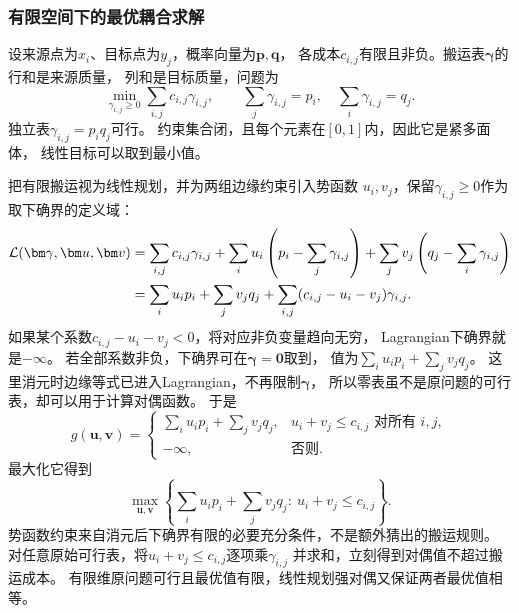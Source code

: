 \subsubsection{有限空间下的最优耦合求解}
\label{sec:information-finite-transport}

设来源点为\(x_i\)、目标点为\(y_j\)，概率向量为\(\bm p,\bm q\)，
各成本\(c_{i,j}\)有限且非负。搬运表\(\bm\gamma\)的行和是来源质量，
列和是目标质量，问题为
\[
  \min_{\gamma_{i,j}\geq0}\sum_{i,j}c_{i,j}\gamma_{i,j},
  \qquad \sum_j\gamma_{i,j}=p_i,\quad\sum_i\gamma_{i,j}=q_j.
\]
独立表\(\gamma_{i,j}=p_iq_j\)可行。
约束集合闭，且每个元素在\([0,1]\)内，因此它是紧多面体，
线性目标可以取到最小值。

把有限搬运视为线性规划，并为两组边缘约束引入势函数
\(u_i,v_j\)，保留\(\gamma_{i,j}\geq0\)作为取下确界的定义域：
\begin{align}
  \mathcal L(\bm\gamma,\bm u,\bm v)
  &=\sum_{i,j}c_{i,j}\gamma_{i,j}
    +\sum_i u_i\left(p_i-\sum_j\gamma_{i,j}\right)
    +\sum_j v_j\left(q_j-\sum_i\gamma_{i,j}\right)\notag\\
  &=\sum_i u_ip_i+\sum_jv_jq_j
    +\sum_{i,j}(c_{i,j}-u_i-v_j)\gamma_{i,j}.
  \label{eq:information-discrete-ot-lagrangian}
\end{align}
如果某个系数\(c_{i,j}-u_i-v_j<0\)，将对应非负变量趋向无穷，
Lagrangian下确界就是\(-\infty\)。
若全部系数非负，下确界可在\(\bm\gamma=\bm0\)取到，
值为\(\sum_i u_ip_i+\sum_jv_jq_j\)。
这里消元时边缘等式已进入Lagrangian，不再限制\(\bm\gamma\)，
所以零表虽不是原问题的可行表，却可以用于计算对偶函数。
于是
\[
  g(\bm u,\bm v)=
  \begin{cases}
    \sum_i u_ip_i+\sum_jv_jq_j,&u_i+v_j\leq c_{i,j}\text{ 对所有 }i,j,\\
    -\infty,&\text{否则}.
  \end{cases}
\]
最大化它得到
\begin{equation}
  \max_{\bm u,\bm v}
  \left\{\sum_i u_ip_i+\sum_jv_jq_j:\ u_i+v_j\leq c_{i,j}\right\}.
  \label{eq:information-discrete-ot-dual}
\end{equation}
势函数约束来自消元后下确界有限的必要充分条件，不是额外猜出的搬运规则。
对任意原始可行表，将\(u_i+v_j\leq c_{i,j}\)逐项乘\(\gamma_{i,j}\)
并求和，立刻得到对偶值不超过搬运成本。
有限维原问题可行且最优值有限，线性规划强对偶又保证两者最优值相等。

